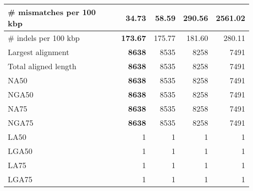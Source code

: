 \documentclass[12pt,a4paper]{article}
\begin{document}
\begin{table}[ht]
\begin{center}
\begin{tabular}{|l*{4}{|r}|}
\# mismatches per 100 kbp & {\bf 34.73} & 58.59 & 290.56 & 2561.02 \\ \hline
\# indels per 100 kbp & {\bf 173.67} & 175.77 & 181.60 & 280.11 \\ \hline
Largest alignment & {\bf 8638} & 8535 & 8258 & 7491 \\ \hline
Total aligned length & {\bf 8638} & 8535 & 8258 & 7491 \\ \hline
NA50 & {\bf 8638} & 8535 & 8258 & 7491 \\ \hline
NGA50 & {\bf 8638} & 8535 & 8258 & 7491 \\ \hline
NA75 & {\bf 8638} & 8535 & 8258 & 7491 \\ \hline
NGA75 & {\bf 8638} & 8535 & 8258 & 7491 \\ \hline
LA50 & 1 & 1 & 1 & 1 \\ \hline
LGA50 & 1 & 1 & 1 & 1 \\ \hline
LA75 & 1 & 1 & 1 & 1 \\ \hline
LGA75 & 1 & 1 & 1 & 1 \\ \hline
\end{tabular}
\end{center}
\end{table}
\end{document}

